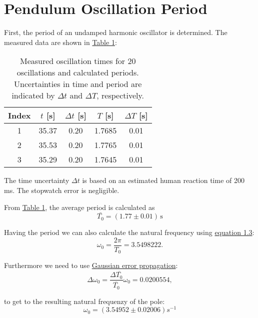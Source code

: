 \twocolumn

\section{Pendulum Oscillation Period}
First, the period of an undamped harmonic oscillator is determined. The measured data are shown in \hyperref[tab:oscillation_data]{Table 1}:

\begin{table}[h!]
    \centering
    \begin{tabular}{c|c|c|c|c}
        \hline
        \textbf{Index} & \textbf{$t$ [s]} & \textbf{$\Delta t$ [s]} & \textbf{$T$ [s]} & \textbf{$\Delta T$ [s]} \\
        \hline
        1 & 35.37 & 0.20 & 1.7685 & 0.01 \\
        2 & 35.53 & 0.20 & 1.7765 & 0.01 \\
        3 & 35.29 & 0.20 & 1.7645  & 0.01 \\
        \hline
    \end{tabular}
    \caption{Measured oscillation times for 20 oscillations and calculated periods. Uncertainties in time and period are indicated by $\Delta t$ and $\Delta T$, respectively.}
    \label{tab:oscillation_data}
\end{table}

The time uncertainty $\Delta t$ is based on an estimated human reaction time of 200 ms. The stopwatch error is negligible. 

From \hyperref[tab:oscillation_data]{Table 1}, the average period is calculated as
\begin{equation}
    \boxed{\bar{T_0} = (1.77 \pm 0.01)\,\mathrm{s}}
\end{equation}

Having the period we can also calculate the natural frequency using \hyperref[eq:period_time]{equation 1.3}:
\begin{equation}
    \omega_0 = \frac{2\pi}{T_0} = 3.5498222.
\end{equation}

Furthermore we need to use \hyperref[eq:eq:gauss_fehlfortpflanzung]{Gaussian error propagation}:
\begin{equation}
    \Delta \omega_0 = \frac{\Delta \overline{T_0}}{\overline{T_0}} \omega_0 = 0.0200554,
\end{equation}

to get to the resulting natural frequenzy of the pole:
\begin{equation}
    \boxed{\omega_0 = (3.54952 \pm 0.02006) s^{-1}}
\end{equation}


